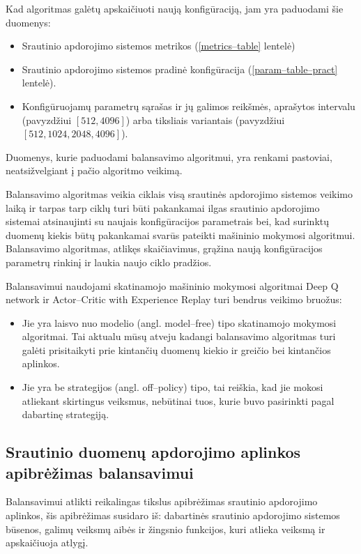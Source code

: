 \documentclass{VUMIFPSbakalaurinis}
\begin{document}
Kad algoritmas galėtų apskaičiuoti naują konfigūraciją, jam yra paduodami šie duomenys:
\begin{itemize}
    \item Srautinio apdorojimo sistemos metrikos (\ref{metrics–table} lentelė)
    \item Srautinio apdorojimo sistemos pradinė konfigūracija (\ref{param–table–pract} lentelė).
    \item Konfigūruojamų parametrų sąrašas ir jų galimos reikšmės, aprašytos intervalu (pavyzdžiui \([512,4096]\)) arba tiksliais variantais (pavyzdžiui \([512, 1024, 2048, 4096]\)).
\end{itemize}
Duomenys, kurie paduodami balansavimo algoritmui, yra renkami pastoviai, neatsižvelgiant į pačio algoritmo veikimą.

Balansavimo algoritmas veikia ciklais visą srautinės apdorojimo sistemos veikimo laiką ir tarpas tarp ciklų turi būti pakankamai ilgas srautinio apdorojimo sistemai atsinaujinti su naujais konfigūracijos parametrais bei, kad surinktų duomenų kiekis būtų pakankamai svarūs pateikti mašininio mokymosi algoritmui. Balansavimo algoritmas, atlikęs skaičiavimus, grąžina naują konfigūracijos parametrų rinkinį ir laukia naujo ciklo pradžios. 

Balansavimui naudojami skatinamojo mašininio mokymosi algoritmai Deep Q network \cite{fan2020theoretical} ir Actor–Critic with Experience Replay \cite{wang2016sample} turi bendrus veikimo bruožus:
\begin{itemize}
    \item Jie yra laisvo nuo modelio (angl. model–free) tipo skatinamojo mokymosi algoritmai. Tai aktualu mūsų atveju kadangi balansavimo algoritmas turi galėti prisitaikyti prie kintančių duomenų kiekio ir greičio bei kintančios aplinkos.
    \item Jie yra be strategijos (angl. off–policy) tipo, tai reiškia, kad jie mokosi atliekant skirtingus veiksmus, nebūtinai tuos, kurie buvo pasirinkti pagal dabartinę strategiją.
\end{itemize} 

\subsection{Srautinio duomenų apdorojimo aplinkos apibrėžimas balansavimui}

Balansavimui atlikti reikalingas tikslus apibrėžimas srautinio apdorojimo aplinkos, šis apibrėžimas susidaro iš: dabartinės srautinio apdorojimo sistemos būsenos, galimų veiksmų aibės ir žingsnio funkcijos, kuri atlieka veiksmą ir apskaičiuoja atlygį.
\end{document}
